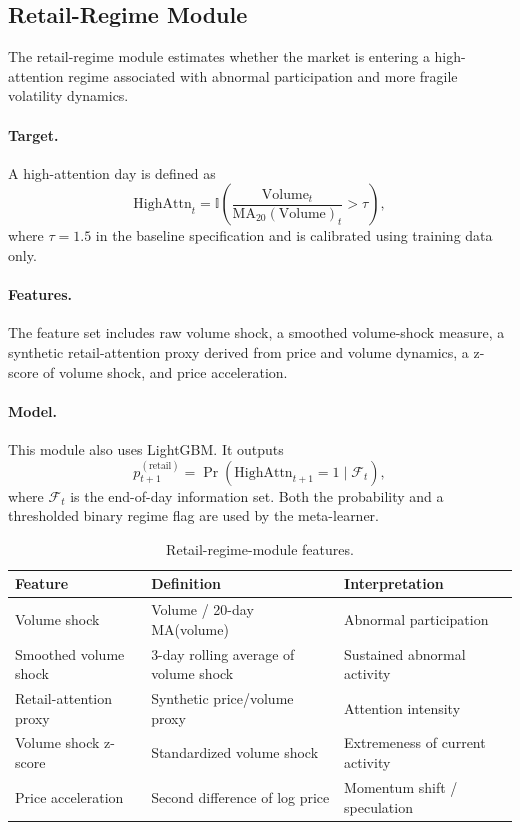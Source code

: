 \documentclass[review]{elsarticle}
\begin{document}
\subsection{Retail-Regime Module}\label{retail-regime-agent}

The retail-regime module estimates whether the market is entering a high-attention regime associated with abnormal participation and more fragile volatility dynamics.

\paragraph{Target.}
A high-attention day is defined as
\begin{equation}\label{eq:retail-regime}
\text{HighAttn}_t =
\mathbb{I}\!\left(
\frac{\text{Volume}_t}{\text{MA}_{20}(\text{Volume})_t} > \tau
\right),
\end{equation}
where $\tau=1.5$ in the baseline specification and is calibrated using training data only.

\paragraph{Features.}
The feature set includes raw volume shock, a smoothed volume-shock measure, a synthetic retail-attention proxy derived from price and volume dynamics, a z-score of volume shock, and price acceleration.

\paragraph{Model.}
This module also uses LightGBM. It outputs
\[
p_{t+1}^{(\text{retail})} = \Pr\!\left(\text{HighAttn}_{t+1}=1 \mid \mathcal{F}_t\right),
\]
where $\mathcal{F}_t$ is the end-of-day information set. Both the probability and a thresholded binary regime flag are used by the meta-learner.

\begin{table}[t]
\centering
\caption{Retail-regime-module features.}
\label{tab:retail-features}
\begin{tabular}{lll}
\hline
Feature & Definition & Interpretation \\\hline
Volume shock & Volume / 20-day MA(volume) & Abnormal participation \\
Smoothed volume shock & 3-day rolling average of volume shock & Sustained abnormal activity \\
Retail-attention proxy & Synthetic price/volume proxy & Attention intensity \\
Volume shock z-score & Standardized volume shock & Extremeness of current activity \\
Price acceleration & Second difference of log price & Momentum shift / speculation \\\hline
\end{tabular}
\end{table}
\end{document}

